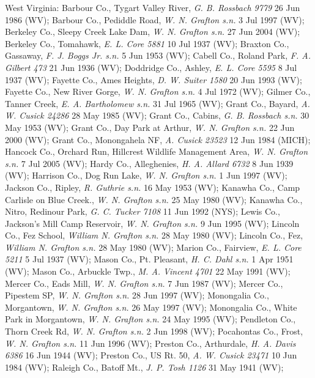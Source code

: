 \documentclass{article}
\begin{document}
West Virginia:
Barbour Co.,  Tygart Valley River, \textit{G. B. Rossbach 9779} 26 Jun 1986 (WV);
Barbour Co., Pediddle Road, \textit{W. N. Grafton s.n.} 3 Jul 1997 (WV);
Berkeley Co., Sleepy Creek Lake Dam, \textit{W. N. Grafton s.n.} 27 Jun 2004 (WV);
Berkeley Co., Tomahawk, \textit{E. L. Core 5881} 10 Jul 1937 (WV);
Braxton Co., Gassaway, \textit{F. J. Boggs Jr. s.n.} 5 Jun 1953 (WV);
Cabell Co., Roland Park, \textit{F. A. Gilbert 473} 21 Jun 1936 (WV);
Doddridge Co., Ashley, \textit{E. L. Core 5595} 8 Jul 1937 (WV);
Fayette Co., Ames Heights, \textit{D. W. Suiter 1580} 20 Jun 1993 (WV);
Fayette Co., New River Gorge, \textit{W. N. Grafton s.n.} 4 Jul 1972 (WV);
Gilmer Co., Tanner Creek, \textit{E. A. Bartholomew s.n.} 31 Jul 1965 (WV);
Grant Co., Bayard, \textit{A. W. Cusick 24286} 28 May 1985 (WV);
Grant Co., Cabins, \textit{G. B. Rossbach s.n.} 30 May 1953 (WV);
Grant Co., Day Park at Arthur, \textit{W. N. Grafton s.n.} 22 Jun 2000 (WV);
Grant Co., Monongahela NF, \textit{A. Cusick 23523} 12 Jun 1984 (MICH);
Hancock Co., Orchard Run, Hillcrest Wildlife Management Area, \textit{W. N. Grafton s.n.} 7 Jul 2005 (WV);
Hardy Co., Alleghenies, \textit{H. A. Allard 6732} 8 Jun 1939 (WV);
Harrison Co., Dog Run Lake, \textit{W. N. Grafton s.n.} 1 Jun 1997 (WV);
Jackson Co., Ripley, \textit{R. Guthrie s.n.} 16 May 1953 (WV);
Kanawha Co., Camp Carlisle on Blue Creek., \textit{W. N. Grafton s.n.} 25 May 1980 (WV);
Kanawha Co., Nitro, Redinour Park, \textit{G. C. Tucker 7108} 11 Jun 1992 (NYS);
Lewis Co., Jackson's Mill Camp Reservoir, \textit{W. N. Grafton s.n.} 9 Jun 1995 (WV);
Lincoln Co.,  Fez School, \textit{William N. Grafton s.n.} 28 May 1980 (WV);
Lincoln Co.,  Fez, \textit{William N. Grafton s.n.} 28 May 1980 (WV);
Marion Co., Fairview, \textit{E. L. Core 5211} 5 Jul 1937 (WV);
Mason Co., Pt. Pleasant, \textit{H. C. Dahl s.n.} 1 Apr 1951 (WV);
Mason Co., Arbuckle Twp., \textit{M. A. Vincent 4701} 22 May 1991 (WV);
Mercer Co., Eads Mill, \textit{W. N. Grafton s.n.} 7 Jun 1987 (WV);
Mercer Co., Pipestem SP, \textit{W. N. Grafton s.n.} 28 Jun 1997 (WV);
Monongalia Co., Morgantown, \textit{W. N. Grafton s.n.} 26 May 1997 (WV);
Monongalia Co., White Park in Morgantown, \textit{W. N. Grafton s.n.} 24 May 1995 (WV);
Pendleton Co., Thorn Creek Rd, \textit{W. N. Grafton s.n.} 2 Jun 1998 (WV);
Pocahontas Co., Frost, \textit{W. N. Grafton s.n.} 11 Jun 1996 (WV);
Preston Co., Arthurdale, \textit{H. A. Davis 6386} 16 Jun 1944 (WV);
Preston Co., US Rt. 50, \textit{A. W. Cusick 23471} 10 Jun 1984 (WV);
Raleigh Co., Batoff Mt., \textit{J. P. Tosh 1126} 31 May 1941 (WV);
\end{document}
